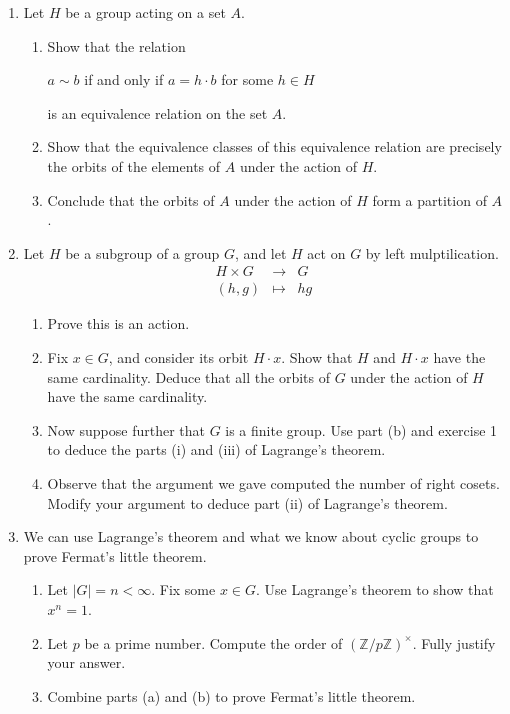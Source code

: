 \documentclass[11pt]{article}
\newcommand{\bZ}{\mathbb{Z}}
\begin{document}
\begin{enumerate}
  \item Let $H$ be a group acting on a set $A$.
  \begin{enumerate}
    \item Show that the relation
    \begin{center}
      $a\sim b$ if and only if $a = h\cdot b$ for some $h\in H$
    \end{center}
    is an equivalence relation on the set $A$.
    \item Show that the equivalence classes of this equivalence relation are precisely the orbits of the elements of $A$ under the action of $H$.
    \item Conclude that the orbits of $A$ under the action of $H$ form a partition of $A$.
  \end{enumerate}
  \item Let $H$ be a subgroup of a group $G$, and let $H$ act on $G$ by left mulptilication.
  \begin{eqnarray*}
    H\times G &\to& G\\
    (h,g) &\mapsto& hg
  \end{eqnarray*}
  \begin{enumerate}
    \item Prove this is an action.
    \item Fix $x\in G$, and consider its orbit $H\cdot x$. Show that $H$ and $H\cdot x$ have the same cardinality.  Deduce that all the orbits of $G$ under the action of $H$ have the same cardinality.
    \item Now suppose further that $G$ is a finite group.  Use part (b) and exercise 1 to deduce the parts (i) and (iii) of Lagrange's theorem.
    \item Observe that the argument we gave computed the number of right cosets.  Modify your argument to deduce part (ii) of Lagrange's theorem.
  \end{enumerate}
  \item We can use Lagrange's theorem and what we know about cyclic groups to prove Fermat's little theorem.
  \begin{enumerate}
    \item Let $|G|=n<\infty$.  Fix some $x\in G$.  Use Lagrange's theorem to show that $x^n = 1$.
    \item Let $p$ be a prime number.  Compute the order of $(\bZ/p\bZ)^\times$.  Fully justify your answer.
    \item Combine parts (a) and (b) to prove Fermat's little theorem.

\end{enumerate}
\end{enumerate}
\end{document}
